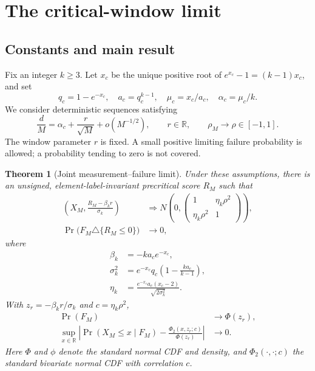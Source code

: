 \documentclass[11pt,a4paper]{article}
\newtheorem{theorem}{Theorem}
\begin{document}
\section{The critical-window limit}
\subsection{Constants and main result}
Fix an integer $k\ge3$. Let $x_c$ be the unique positive root of
$e^{x_c}-1=(k-1)x_c$, and set
\begin{equation}
q_c=1-e^{-x_c},\quad a_c=q_c^{k-1},\quad
\mu_c=x_c/a_c,\quad\alpha_c=\mu_c/k.
\end{equation}
We consider deterministic sequences satisfying
\begin{equation}
\frac dM=\alpha_c+\frac r{\sqrt M}+o(M^{-1/2}),\qquad
r\in\mathbb R,\qquad\rho_M\longrightarrow\rho\in[-1,1].\label{eq:window}
\end{equation}
The window parameter $r$ is fixed. A small positive limiting failure probability is allowed; a probability tending to zero is not covered.

\begin{theorem}[Joint measurement--failure limit]\label{thm:main}
Under these assumptions, there is an unsigned, element-label-invariant precritical score $R_M$ such that
\begin{align}
\left(X_M,\frac{R_M-\beta_k r}{\sigma_k}\right)
&\Rightarrow N\!\left(0,\begin{pmatrix}1&\eta_k\rho^2\\\eta_k\rho^2&1\end{pmatrix}\right),\label{eq:joint}\\
\Pr\bigl(F_M\triangle\{R_M\le0\}\bigr)&\longrightarrow0,\label{eq:transfer}
\end{align}
where
\begin{align}
\beta_k&=-ka_ce^{-x_c},\\
\sigma_k^2&=e^{-x_c}q_c\left(1-\frac{k a_c}{k-1}\right),\\
\eta_k&=\frac{e^{-x_c}a_c(x_c-2)}{\sqrt{2\sigma_k^2}}.\label{eq:eta}
\end{align}
With $z_r=-\beta_k r/\sigma_k$ and $c=\eta_k\rho^2$,
\begin{align}
\Pr(F_M)&\longrightarrow\Phi(z_r),\\
\sup_{x\in\mathbb R}\left|\Pr(X_M\le x\mid F_M)
-\frac{\Phi_2(x,z_r;c)}{\Phi(z_r)}\right|&\longrightarrow0.\label{eq:selection}
\end{align}
Here $\Phi$ and $\phi$ denote the standard normal CDF and density, and $\Phi_2(\cdot,\cdot;c)$ the standard bivariate normal CDF with correlation $c$.
\end{theorem}
\end{document}
